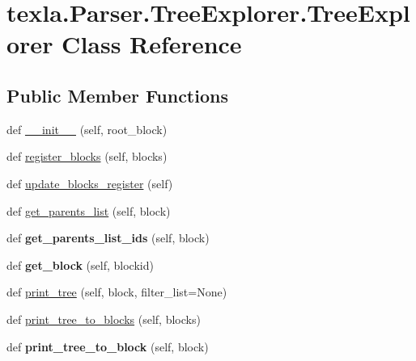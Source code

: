 \hypertarget{classtexla_1_1Parser_1_1TreeExplorer_1_1TreeExplorer}{}\section{texla.\+Parser.\+Tree\+Explorer.\+Tree\+Explorer Class Reference}
\label{classtexla_1_1Parser_1_1TreeExplorer_1_1TreeExplorer}
\subsection*{Public Member Functions}
\begin{DoxyCompactItemize}
\item 
def \hyperlink{classtexla_1_1Parser_1_1TreeExplorer_1_1TreeExplorer_a02f877a37a394d2a471cab047dc04529}{\+\_\+\+\_\+init\+\_\+\+\_\+} (self, root\+\_\+block)
\item 
def \hyperlink{classtexla_1_1Parser_1_1TreeExplorer_1_1TreeExplorer_a07c509d8c1ce6695e1e343b722b19dbe}{register\+\_\+blocks} (self, blocks)
\item 
def \hyperlink{classtexla_1_1Parser_1_1TreeExplorer_1_1TreeExplorer_a920a80c8a3e38a5144641b688938ad8d}{update\+\_\+blocks\+\_\+register} (self)
\item 
def \hyperlink{classtexla_1_1Parser_1_1TreeExplorer_1_1TreeExplorer_ad948e5828a35215fa58ec9ba7e194e7e}{get\+\_\+parents\+\_\+list} (self, block)
\item 
\hypertarget{classtexla_1_1Parser_1_1TreeExplorer_1_1TreeExplorer_a9dce5eba74c14d0adc0586665bc1119a}{}\label{classtexla_1_1Parser_1_1TreeExplorer_1_1TreeExplorer_a9dce5eba74c14d0adc0586665bc1119a} 
def {\bfseries get\+\_\+parents\+\_\+list\+\_\+ids} (self, block)
\item 
\hypertarget{classtexla_1_1Parser_1_1TreeExplorer_1_1TreeExplorer_a26e9613885db6426e6ba450b747460fe}{}\label{classtexla_1_1Parser_1_1TreeExplorer_1_1TreeExplorer_a26e9613885db6426e6ba450b747460fe} 
def {\bfseries get\+\_\+block} (self, blockid)
\item 
def \hyperlink{classtexla_1_1Parser_1_1TreeExplorer_1_1TreeExplorer_a3fb88b30a1ed2a58cbb3e4c1099c7ddd}{print\+\_\+tree} (self, block, filter\+\_\+list=None)
\item 
def \hyperlink{classtexla_1_1Parser_1_1TreeExplorer_1_1TreeExplorer_a958b21268709209a935f718b6a7b8c3d}{print\+\_\+tree\+\_\+to\+\_\+blocks} (self, blocks)
\item 
\hypertarget{classtexla_1_1Parser_1_1TreeExplorer_1_1TreeExplorer_a576660a84acb13e5852d716ed6707278}{}\label{classtexla_1_1Parser_1_1TreeExplorer_1_1TreeExplorer_a576660a84acb13e5852d716ed6707278} 
def {\bfseries print\+\_\+tree\+\_\+to\+\_\+block} (self, block)
\end{DoxyCompactItemize}
